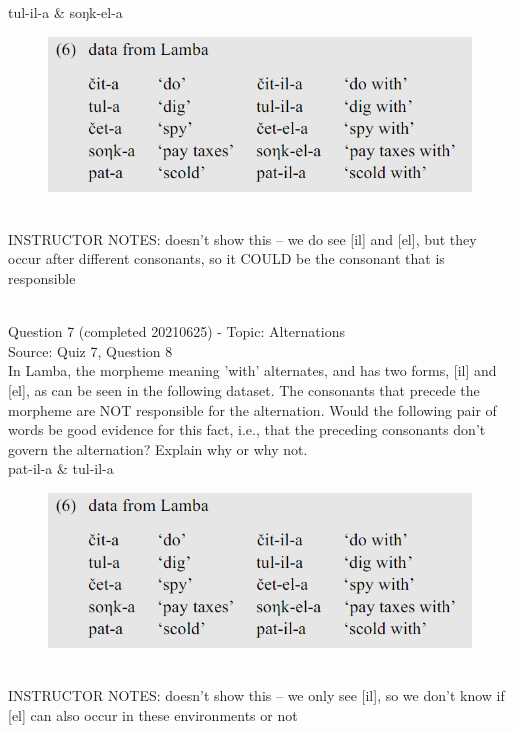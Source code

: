 \documentclass[12pt]{article}
\begin{document}
tul-il-a \& soŋk-el-a

\begin{figure}[H]
\includegraphics{../images/peng119_lamba.png}
\end{figure}

~\\
INSTRUCTOR NOTES: doesn't show this -- we do see [il] and [el], but they occur after different consonants, so it COULD be the consonant that is responsible


~\\

{\large Question 7} (completed 20210625) - Topic: Alternations\\
Source: Quiz 7, Question 8\\

In Lamba, the morpheme meaning 'with' alternates, and has two forms, [il] and [el], as can be seen in the following dataset. The consonants that precede the morpheme are NOT responsible for the alternation. Would the following pair of words be good evidence for this fact, i.e., that the preceding consonants don't govern the alternation? Explain why or why not.\\

pat-il-a \& tul-il-a

\begin{figure}[H]
\includegraphics{../images/peng119_lamba.png}
\end{figure}

~\\
INSTRUCTOR NOTES: doesn't show this -- we only see [il], so we don't know if [el] can also occur in these environments or not
\end{document}
